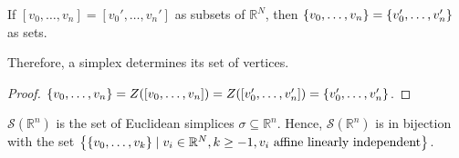 \begin{corollary}
	If \( [v_0, \dots, v_n] = [v_0', \dots, v_n'] \) as subsets of \( \mathbb R^N \), then \( \qty{v_0, \dots, v_n} = \qty{v_0', \dots, v_n'} \) as sets.
\end{corollary}
Therefore, a simplex determines its set of vertices.
\begin{proof}
	\( \qty{v_0, \dots, v_n} = Z([v_0, \dots, v_n]) = Z([v_0', \dots, v_n']) = \qty{v_0', \dots, v_n'} \).
\end{proof}
\begin{definition}
	\( \mathcal S(\mathbb R^n) \) is the set of Euclidean simplices \( \sigma \subseteq \mathbb R^n \).
	Hence, \( \mathcal S(\mathbb R^n) \) is in bijection with the set \( \qty{\qty{v_0, \dots, v_k} \mid v_i \in \mathbb R^N, k \geq -1, v_i \text{ affine linearly independent}} \).
\end{definition}

